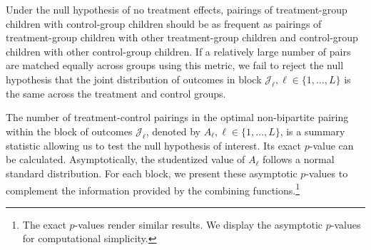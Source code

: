 Under the null hypothesis of no treatment effects, pairings of treatment-group children with control-group children should be as frequent as pairings of treatment-group children with other treatment-group children and control-group children with other control-group children. If a relatively large number of pairs are matched equally across groups using this metric, we fail to reject the null hypothesis that the joint distribution of outcomes in block $\mathcal{J}_{\ell}, \ell \in \{1,\dots ,L\}$ is the same across the treatment and control groups.

The number of treatment-control pairings in the optimal non-bipartite pairing within the block of outcomes $\mathcal{J}_\ell$, denoted by $A_{\ell}, \ell \in \{1,\dots ,L\}$, is a summary statistic allowing us to test the null hypothesis of interest. Its exact $p$-value can be calculated. Asymptotically, the studentized value of $A_\ell$ follows a normal standard distribution. For each block, we present these asymptotic $p$-values to complement the information provided by the combining functions.\footnote{The exact $p$-values render similar results. We display the asymptotic $p$-values for computational simplicity.}
